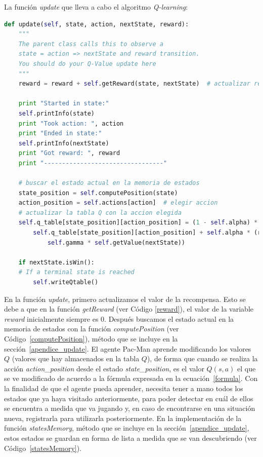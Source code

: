 \documentclass[11pt]{exam}
\begin{document}
La función \textit{update} que lleva a cabo el algoritmo \textit{Q-learning}:
\vspace*{3mm}

\begin{lstlisting}[caption={Función update.}, label={update}, language=python, basicstyle=\footnotesize]
def update(self, state, action, nextState, reward):
	"""
	The parent class calls this to observe a
	state = action => nextState and reward transition.
	You should do your Q-Value update here
	"""
	reward = reward + self.getReward(state, nextState)  # actualizar recompensa
	
	print "Started in state:"
	self.printInfo(state)
	print "Took action: ", action
	print "Ended in state:"
	self.printInfo(nextState)
	print "Got reward: ", reward
	print "---------------------------------"

	# buscar el estado actual en la memoria de estados
	state_position = self.computePosition(state)
	action_position = self.actions[action]  # elegir accion
	# actualizar la tabla Q con la accion elegida
	self.q_table[state_position][action_position] = (1 - self.alpha) * 
		self.q_table[state_position][action_position] + self.alpha * (reward + 
			self.gamma * self.getValue(nextState))

	if nextState.isWin():
	# If a terminal state is reached
		self.writeQtable()
\end{lstlisting}

En la función \textit{update}, primero actualizamos el valor de la recompensa. Esto se debe a que en la función \textit{getReward} (ver Código \ref{reward}), el valor de la variable \textit{reward} inicialmente siempre es 0. Después buscamos el estado actual en la memoria de estados con la función \textit{computePosition} (ver Código~\ref{computePosition}), método que se incluye en la sección~\ref{apendice_update}. El agente Pac-Man aprende modificando los valores $Q$ (valores que hay almacenados en la tabla $Q$), de forma que cuando se realiza la acción \textit{action\_position} desde el estado \textit{state\_position}, es el valor $Q(s,a)$ el que se ve modificado de acuerdo a la fórmula expresada en la ecuación~\ref{formula}. Con la finalidad de que el agente pueda aprender, necesita tener a mano todos los estados que ya haya visitado anteriormente, para poder detectar en cuál de ellos se encuentra a medida que va jugando y, en caso de encontrarse en una situación nueva, registrarla para utilizarla posteriormente. En la implementación de la función \textit{statesMemory}, método que se incluye en la sección~\ref{apendice_update}, estos estados se guardan en forma de lista a medida que se van descubriendo (ver Código~\ref{statesMemory}).
\vspace*{3mm}
\end{document}
